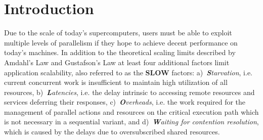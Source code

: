 \documentclass{sig-alternate}
\newcommand{\I}[1]{\textit{#1}}
\newcommand{\B}[1]{\textbf{#1}}
\newcommand{\up}{\vspace*{-0.25em}}
\begin{document}
{}

\newpage
\section{Introduction}

Due to the scale of today's supercomputers, users must be able to exploit multiple levels of parallelism
if they hope to achieve decent performance on today's machines.
In addition to the theoretical scaling limits described by Amdahl's Law\cite{amdahl1967validity} and Gustafson's Law\cite{gustafson88}
at least four additional factors limit application scalability, also referred to as the \B{SLOW} factors: a)~\I{\B{S}tarvation}, i.e.
current concurrent work is insufficient to maintain
high utilization of all resources, b)~\I{\B{L}atencies}, i.e. the delay intrinsic to accessing remote
resources and services deferring their responses, c)~\I{\B{O}verheads}, i.e. the
work required for the management of parallel actions and
resources on the critical execution path which is not necessary in a sequential variant, and d)~\I{\B{W}aiting for
contention resolution}, which is caused by the delays due to oversubscribed
shared resources.
\end{document}
